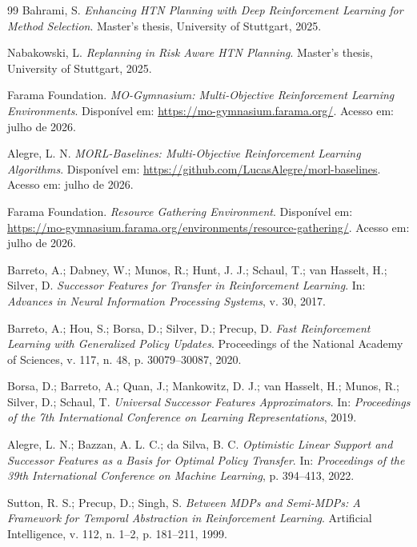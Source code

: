 \begin{thebibliography}{99}
Bahrami, S.
\textit{Enhancing HTN Planning with Deep Reinforcement Learning for Method
Selection}.
Master's thesis, University of Stuttgart, 2025.

Nabakowski, L.
\textit{Replanning in Risk Aware HTN Planning}.
Master's thesis, University of Stuttgart, 2025.

Farama Foundation.
\textit{MO-Gymnasium: Multi-Objective Reinforcement Learning Environments}.
Disponível em: \url{https://mo-gymnasium.farama.org/}.
Acesso em: julho de 2026.

Alegre, L. N.
\textit{MORL-Baselines: Multi-Objective Reinforcement Learning Algorithms}.
Disponível em: \url{https://github.com/LucasAlegre/morl-baselines}.
Acesso em: julho de 2026.

Farama Foundation.
\textit{Resource Gathering Environment}.
Disponível em:
\url{https://mo-gymnasium.farama.org/environments/resource-gathering/}.
Acesso em: julho de 2026.

Barreto, A.; Dabney, W.; Munos, R.; Hunt, J. J.; Schaul, T.;
van Hasselt, H.; Silver, D.
\textit{Successor Features for Transfer in Reinforcement Learning}.
In: \textit{Advances in Neural Information Processing Systems},
v. 30, 2017.

Barreto, A.; Hou, S.; Borsa, D.; Silver, D.; Precup, D.
\textit{Fast Reinforcement Learning with Generalized Policy Updates}.
Proceedings of the National Academy of Sciences,
v. 117, n. 48, p. 30079--30087, 2020.

Borsa, D.; Barreto, A.; Quan, J.; Mankowitz, D. J.;
van Hasselt, H.; Munos, R.; Silver, D.; Schaul, T.
\textit{Universal Successor Features Approximators}.
In: \textit{Proceedings of the 7th International Conference on Learning
Representations}, 2019.

Alegre, L. N.; Bazzan, A. L. C.; da Silva, B. C.
\textit{Optimistic Linear Support and Successor Features as a Basis for
Optimal Policy Transfer}.
In: \textit{Proceedings of the 39th International Conference on Machine
Learning}, p. 394--413, 2022.

Sutton, R. S.; Precup, D.; Singh, S.
\textit{Between MDPs and Semi-MDPs: A Framework for Temporal Abstraction in
Reinforcement Learning}.
Artificial Intelligence, v. 112, n. 1--2,
p. 181--211, 1999.


\end{thebibliography}
